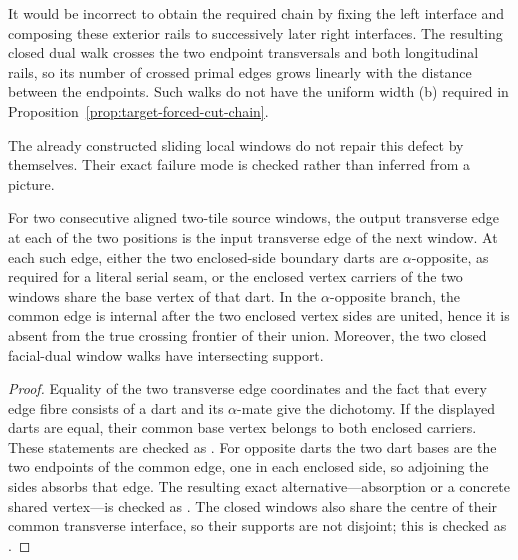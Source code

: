 It would be incorrect to obtain the required chain by fixing the left
interface and composing these exterior rails to successively later right
interfaces.  The resulting closed dual walk crosses the two endpoint
transversals and both longitudinal rails, so its number of crossed primal
edges grows linearly with the distance between the endpoints.  Such walks do
not have the uniform width (b) required in
Proposition~\ref{prop:target-forced-cut-chain}.

The already constructed sliding local windows do not repair this defect by
themselves.  Their exact failure mode is checked rather than inferred from a
picture.

\begin{lemma}
\label{lem:source-local-window-seriality}
For two consecutive aligned two-tile source windows, the output transverse
edge at each of the two positions is the input transverse edge of the next
window.  At each such edge, either the two enclosed-side boundary darts are
$\alpha$-opposite, as required for a literal serial seam, or the enclosed
vertex carriers of the two windows share the base vertex of that dart.  In
the $\alpha$-opposite branch, the common edge is internal after the two
enclosed vertex sides are united, hence it is absent from the true crossing
frontier of their union.  Moreover, the two closed facial-dual window walks
have intersecting support.
\end{lemma}

\begin{proof}
Equality of the two transverse edge coordinates and the fact that every
edge fibre consists of a dart and its $\alpha$-mate give the dichotomy.  If
the displayed darts are equal, their common base vertex belongs to both
enclosed carriers.  These statements are checked as
.
For opposite darts the two dart bases are the two endpoints of the common
edge, one in each enclosed side, so adjoining the sides absorbs that edge.
The resulting exact alternative---absorption or a concrete shared
vertex---is checked as
.
The closed windows also share the centre of their common transverse
interface, so their supports are not disjoint; this is checked as
.
\end{proof}


